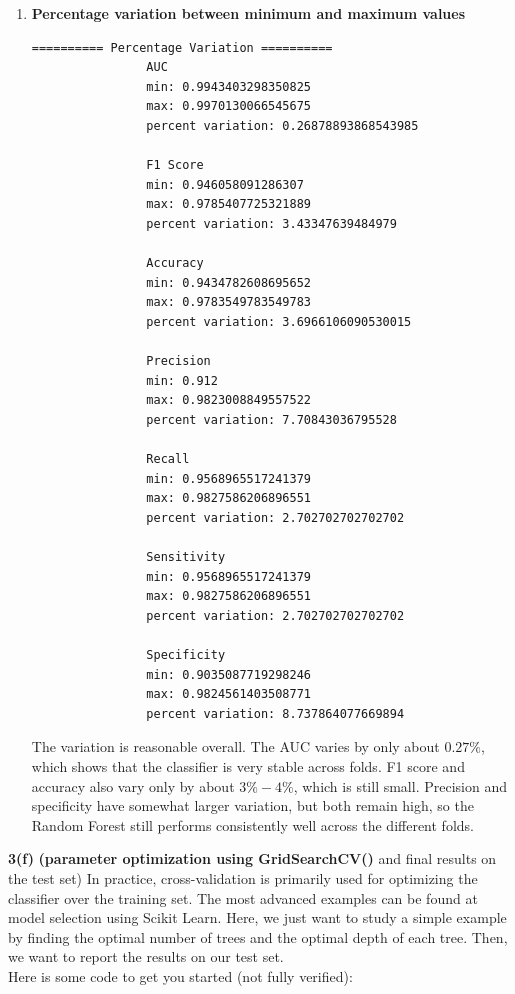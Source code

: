 \documentclass[11pt]{article}
\begin{document}
\begin{enumerate}[label=\roman*.]
\begin{enumerate}
			\item \textbf{Percentage variation between minimum and maximum values}
			
			\begin{lstlisting}[style=matlabstyle]
				========== Percentage Variation ==========
				AUC
				min: 0.9943403298350825
				max: 0.9970130066545675
				percent variation: 0.26878893868543985
				
				F1 Score
				min: 0.946058091286307
				max: 0.9785407725321889
				percent variation: 3.43347639484979
				
				Accuracy
				min: 0.9434782608695652
				max: 0.9783549783549783
				percent variation: 3.6966106090530015
				
				Precision
				min: 0.912
				max: 0.9823008849557522
				percent variation: 7.70843036795528
				
				Recall
				min: 0.9568965517241379
				max: 0.9827586206896551
				percent variation: 2.702702702702702
				
				Sensitivity
				min: 0.9568965517241379
				max: 0.9827586206896551
				percent variation: 2.702702702702702
				
				Specificity
				min: 0.9035087719298246
				max: 0.9824561403508771
				percent variation: 8.737864077669894
			\end{lstlisting}
			
			The variation is reasonable overall. The AUC varies by only about \(0.27\%\), which shows that the classifier is very stable across folds. F1 score and accuracy also vary only by about \(3\%-4\%\), which is still small. Precision and specificity have somewhat larger variation, but both remain high, so the Random Forest still performs consistently well across the different folds.
			
		\end{enumerate}
		
	\end{enumerate}
	
	\textbf{3(f)} \textbf{(parameter optimization using GridSearchCV()} and final results on the test set) In practice, cross-validation is primarily used for optimizing the classifier over the training set. The most advanced examples can be found at model selection using Scikit Learn. Here, we just want to study a simple example by finding the optimal number of trees and the optimal depth of each tree. Then, we want to report the results on our test set.\\
	
	Here is some code to get you started (not fully verified):
	
\end{document}
